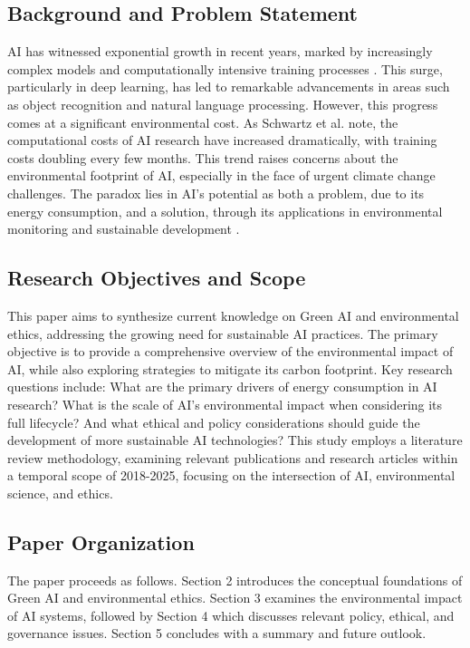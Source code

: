\documentclass[twoside]{ai_ethics_class}
\begin{document}
\subsection{Background and Problem Statement}
AI has witnessed exponential growth in recent years, marked by increasingly complex models and computationally intensive training processes \cite{schwartz2020green}.
This surge, particularly in deep learning, has led to remarkable advancements in areas such as object recognition and natural language processing.
However, this progress comes at a significant environmental cost.
As Schwartz et al. note, the computational costs of AI research have increased dramatically, with training costs doubling every few months.
This trend raises concerns about the environmental footprint of AI, especially in the face of urgent climate change challenges.
The paradox lies in AI's potential as both a problem, due to its energy consumption, and a solution, through its applications in environmental monitoring and sustainable development \cite{cowls2021ai,rolnick2022tackling}.

\subsection{Research Objectives and Scope}
This paper aims to synthesize current knowledge on Green AI and environmental ethics, addressing the growing need for sustainable AI practices.
The primary objective is to provide a comprehensive overview of the environmental impact of AI, while also exploring strategies to mitigate its carbon footprint.
Key research questions include: What are the primary drivers of energy consumption in AI research? What is the scale of AI's environmental impact when considering its full lifecycle? And what ethical and policy considerations should guide the development of more sustainable AI technologies? This study employs a literature review methodology, examining relevant publications and research articles within a temporal scope of 2018-2025, focusing on the intersection of AI, environmental science, and ethics.

\subsection{Paper Organization}
The paper proceeds as follows.
Section 2 introduces the conceptual foundations of Green AI and environmental ethics.
Section 3 examines the environmental impact of AI systems, followed by Section 4 which discusses relevant policy, ethical, and governance issues.
Section 5 concludes with a summary and future outlook.
\end{document}
